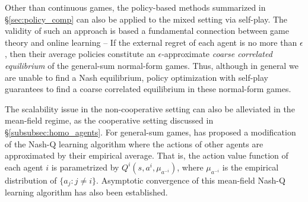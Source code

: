  
Other than continuous games,  
the policy-based methods summarized  in \S\ref{sec:policy_comp} can also be applied to the mixed setting via self-play. 
The validity of such an approach is based a fundamental connection between game theory and online learning -- If the external regret of each agent is no more than $\epsilon$, then their  average policies constitute an $\epsilon$-approximate
 \textit{coarse correlated equilibrium}  \cite{hart2000simple,hart2001general, hart2003uncoupled} of the general-sum normal-form games. Thus, although in general we are unable to find a Nash equilibrium, policy optimization with self-play   guarantees to  find a coarse correlated equilibrium in these normal-form games. 


\vspace{6pt}
\vspace{3pt}

The scalability issue in the non-cooperative setting can also be alleviated in the mean-field  regime, as the cooperative setting discussed in \S\ref{subsubsec:homo_agents}. 
For general-sum games, 
\cite{pmlr-v80-yang18d} has proposed a modification of the Nash-Q learning algorithm where the actions of other agents are approximated by their empirical average. 
That is, the action value function of each agent $i$ is parametrized by $Q^i (s, a^i, \mu_{a^{-i}} )$, where $\mu_{a^{-i}}$ is the empirical distribution of  $\{a_j \colon j \neq i \}$.
 Asymptotic convergence of this mean-field  Nash-Q learning algorithm has also been established.
 

